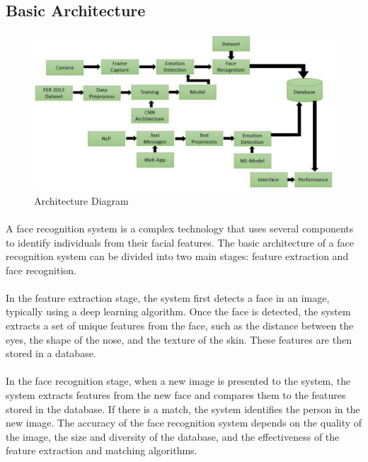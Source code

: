 \subsection{Basic Architecture}
\begin{figure}[!ht]
\centering
\includegraphics[width=125mm]{basic arch.png}
\caption{Architecture Diagram}
\end{figure} 

\paragraph{}
A face recognition system is a complex technology that uses several components to identify individuals from their facial features. The basic architecture of a face recognition system can be divided into two main stages: feature extraction and face recognition.

\paragraph{}
In the feature extraction stage, the system first detects a face in an image, typically using a deep learning algorithm. Once the face is detected, the system extracts a set of unique features from the face, such as the distance between the eyes, the shape of the nose, and the texture of the skin. These features are then stored in a database.

\paragraph{}
In the face recognition stage, when a new image is presented to the system, the system extracts features from the new face and compares them to the features stored in the database. If there is a match, the system identifies the person in the new image. The accuracy of the face recognition system depends on the quality of the image, the size and diversity of the database, and the effectiveness of the feature extraction and matching algorithms.


